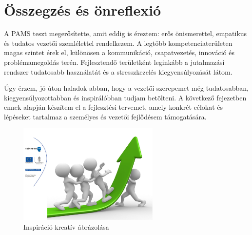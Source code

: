 \section{Összegzés és önreflexió}

A PAMS teszt megerősítette, amit eddig is éreztem: erős önismerettel, empatikus és tudatos vezetői szemlélettel rendelkezem.
A legtöbb kompetenciaterületen magas szintet érek el, különösen a kommunikáció, 
csapatvezetés, innováció és problémamegoldás terén.
Fejlesztendő területként leginkább a jutalmazási rendszer tudatosabb használatát és a stresszkezelés kiegyensúlyozását látom.

Úgy érzem, jó úton haladok abban, hogy a vezetői szerepemet még tudatosabban, 
kiegyensúlyozottabban és inspirálóbban tudjam betölteni.
A következő fejezetben ennek alapján készítem el a fejlesztési tervemet, amely 
konkrét célokat és lépéseket tartalmaz a személyes és vezetői fejlődésem támogatására.
\begin{figure}[H]
	\centering
    \includegraphics[width=70mm, keepaspectratio]{figures/inspiration.jpg}
    \caption{Inspiráció kreatív ábrázolása}
    \label {fig:inspiration}
\end{figure}
